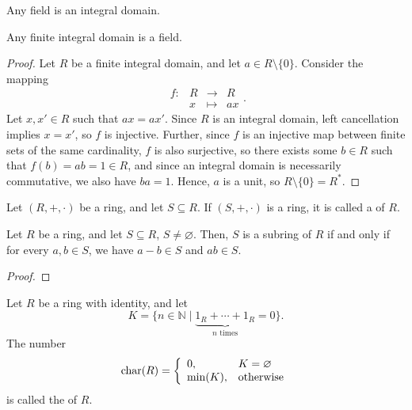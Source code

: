 \begin{cor}
Any field is an integral domain.
\end{cor}

\begin{thm}
Any finite integral domain is a field.
\end{thm}
\begin{proof}
Let $ R $ be a finite integral domain, and let $ a\in R\setminus\{0\} $. Consider the mapping
\begin{equation*}
    \begin{array}{rccc}
        f: & R & \to & R \\
        & x & \mapsto & ax
    \end{array}.
\end{equation*}
Let $ x,x'\in R $ such that $ ax=ax' $. Since $ R $ is an integral domain, left cancellation implies $ x=x' $, so $ f $ is injective. Further, since $ f $ is an injective map between finite sets of the same cardinality, $ f $ is also surjective, so there exists some $ b\in R $ such that $ f(b)=ab=1\in R $, and since an integral domain is necessarily commutative, we also have $ ba=1 $. Hence, $ a $ is a unit, so $ R\setminus\{0\}=R^* $.
\end{proof}

\begin{defn}
Let $ (R,+,\cdot) $ be a ring, and let $ S\subseteq R $. If $ (S,+,\cdot) $ is a ring, it is called a  of $ R $.
\end{defn}

\begin{thm}
Let $ R $ be a ring, and let $ S\subseteq R $, $ S\neq\varnothing $. Then, $ S $ is a subring of $ R $ if and only if for every $ a,b\in S $, we have $ a-b\in S $ and $ ab\in S $.
\end{thm}
\begin{proof}
\end{proof}

\begin{defn}
Let $ R $ be a ring with identity, and let
\begin{equation*}
    K=\{n\in\mathbb{N}\mid\underbrace{1_R+\cdots+1_R}_{n\text{ times}}=0\}.
\end{equation*}
The number
\begin{equation*}
    \operatorname{char}(R)=
    \left\{\begin{array}{ll}
        0, & K=\varnothing \\
        \min(K), & \text{otherwise}
    \end{array}\right.
\end{equation*}
is called the  of $ R $.
\end{defn}

